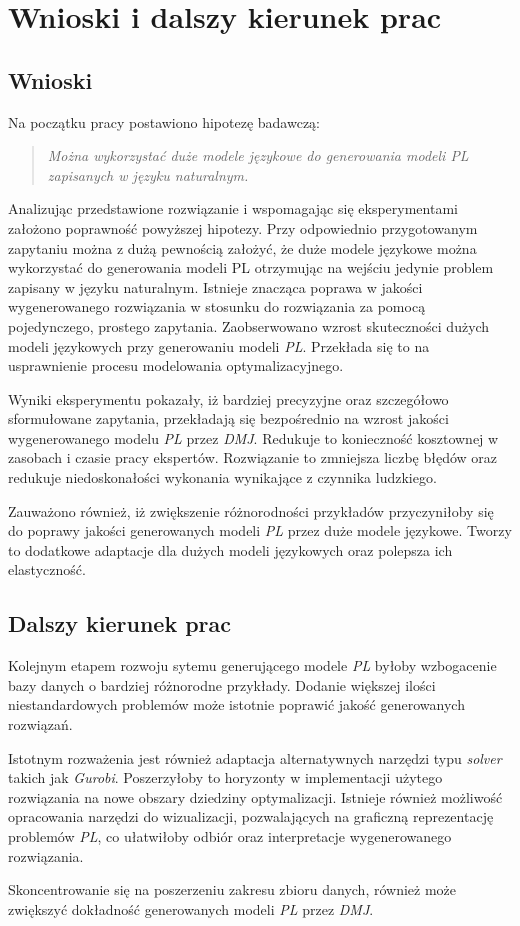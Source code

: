 
\chapter{Wnioski i dalszy kierunek prac}\label{ch:conclusions}

\section{Wnioski}
Na początku pracy postawiono hipotezę badawczą:
\begin{quote}
\textit{Można wykorzystać duże modele językowe do generowania modeli PL zapisanych w języku naturalnym.}
\end{quote}

Analizując przedstawione rozwiązanie i wspomagając się eksperymentami założono poprawność powyższej hipotezy. Przy odpowiednio przygotowanym zapytaniu można z dużą pewnością założyć, że duże modele językowe można wykorzystać do generowania modeli PL otrzymując na wejściu jedynie problem zapisany w języku naturalnym. Istnieje znacząca poprawa w jakości wygenerowanego rozwiązania w stosunku do rozwiązania za pomocą pojedynczego, prostego zapytania. Zaobserwowano wzrost skuteczności dużych modeli językowych przy generowaniu modeli \textit{PL}. Przekłada się to na usprawnienie procesu modelowania optymalizacyjnego. 

Wyniki eksperymentu pokazały, iż bardziej precyzyjne oraz szczegółowo sformułowane zapytania, przekładają się bezpośrednio na wzrost jakości wygenerowanego modelu \textit{PL} przez \textit{DMJ}. Redukuje to konieczność kosztownej w zasobach i czasie pracy ekspertów. Rozwiązanie to zmniejsza liczbę błędów oraz redukuje niedoskonałości wykonania wynikające z czynnika ludzkiego. 

Zauważono również, iż zwiększenie różnorodności przykładów przyczyniłoby się do poprawy jakości generowanych modeli \textit{PL} przez duże modele językowe. Tworzy to dodatkowe adaptacje dla dużych modeli językowych oraz polepsza ich elastyczność.

\section{Dalszy kierunek prac}

Kolejnym etapem rozwoju sytemu generującego modele \textit{PL} byłoby wzbogacenie bazy danych o bardziej różnorodne przykłady. Dodanie większej ilości niestandardowych problemów może istotnie poprawić jakość generowanych rozwiązań.

Istotnym rozważenia jest również adaptacja alternatywnych narzędzi typu \textit{solver} takich jak \textit{Gurobi}. Poszerzyłoby to horyzonty w implementacji użytego rozwiązania na nowe obszary dziedziny optymalizacji. Istnieje również możliwość opracowania narzędzi do wizualizacji, pozwalających na graficzną reprezentację problemów \textit{PL}, co ułatwiłoby odbiór oraz interpretacje wygenerowanego rozwiązania. 

Skoncentrowanie się na poszerzeniu zakresu zbioru danych, również może zwiększyć dokładność generowanych modeli \textit{PL} przez \textit{DMJ}. 